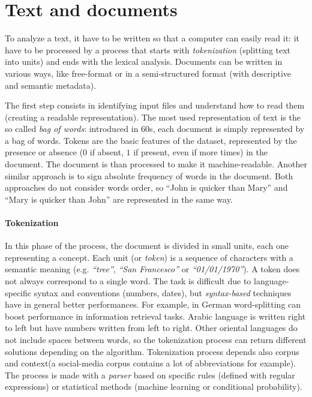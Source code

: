 \documentclass[11pt, a4page]{article}
\begin{document}
\section{Text and documents}
To analyze a text, it have to be written so that a computer can easily read it: it have to be processed by a process that starts with \textit{tokenization} (splitting text into units) and ends with the lexical analysis.
Documents can be written in various ways, like free-format or in a semi-structured format (with descriptive and semantic metadata).

The first step consists in identifying input files and understand how to read them (creating a readable representation).
The most used representation of text is the so called \textit{bag of words}: introduced in 60s, each document is simply represented by a bag of words.
Tokens are the basic features of the dataset, represented by the presence or absence ($0$ if absent, $1$ if present, even if more times) in the document.
The document is than processed to make it machine-readable.
Another similar approach is to sign absolute frequency of words in the document.
Both approaches do not consider words order, so ``John is quicker than Mary'' and ``Mary is quicker than John'' are represented in the same way.

\paragraph{Tokenization}
In this phase of the process, the document is divided in small units, each one representing a concept.
Each unit (or \textit{token}) is a sequence of characters with a semantic meaning (e.g. \textit{``tree''}, \textit{``San Francesco''} or \textit{``01/01/1970''}).
A token does not always correspond to a single word.
The task is difficult due to language-specific syntax and conventions (numbers, dates), but \textit{syntax-based} techniques have in general better performances.
For example, in German word-splitting can boost performance in information retrieval tasks. 
Arabic language is written right to left but have numbers written from left to right.
Other oriental languages do not include spaces between words, so the tokenization process can return different solutions depending on the algorithm.
Tokenization process depends also corpus and context(a social-media corpus contains a lot of abbreviations for example). \newline
The process is made with a \textit{parser} based on specific rules (defined with regular expressions) or statistical methods (machine learning or conditional probability).
\end{document}
